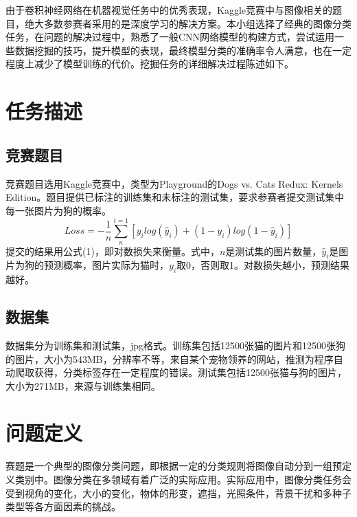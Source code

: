 \documentclass[10.5pt,twocolumn]{jbuaa}
\begin{document}
\wuhao

由于卷积神经网络在机器视觉任务中的优秀表现，Kaggle竞赛中与图像相关的题目，绝大多数参赛者采用的是深度学习的解决方案。本小组选择了经典的图像分类任务，在问题的解决过程中，熟悉了一般CNN网络模型的构建方式，尝试运用一些数据挖掘的技巧，提升模型的表现，最终模型分类的准确率令人满意，也在一定程度上减少了模型训练的代价。挖掘任务的详细解决过程陈述如下。

\section{任务描述}
\subsection{竞赛题目}
竞赛题目选用Kaggle竞赛中，类型为Playground的Dogs vs. Cats Redux: Kernels Edition。题目提供已标注的训练集和未标注的测试集，要求参赛者提交测试集中每一张图片为狗的概率。\enlargethispage{-3.3cm}
\begin{equation}
\label{eqnLabel}
Loss=-\frac 1 n\sum_{n}^{i=1}[y_ilog(\hat y_i)+(1-y_i)log(1-\hat y_i)]
\end{equation}
提交的结果用公式(1)，即对数损失来衡量。式中，$n$是测试集的图片数量，$\hat y_i$是图片为狗的预测概率，图片实际为猫时，$y_i$取0，否则取1。对数损失越小，预测结果越好。
\subsection{数据集}
数据集分为训练集和测试集，jpg格式。训练集包括12500张猫的图片和12500张狗的图片，大小为543MB，分辨率不等，来自某个宠物领养的网站，推测为程序自动爬取获得，分类标签存在一定程度的错误。测试集包括12500张猫与狗的图片，大小为271MB，来源与训练集相同。

\section{问题定义}
赛题是一个典型的图像分类问题，即根据一定的分类规则将图像自动分到一组预定义类别中。图像分类在多领域有着广泛的实际应用。实际应用中，图像分类任务会受到视角的变化，大小的变化，物体的形变，遮挡，光照条件，\enlargethispage{-3.3cm}背景干扰和多种子类型等各方面因素的挑战。
\end{document}
